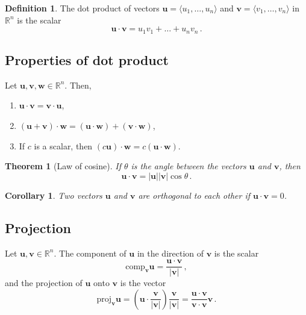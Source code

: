 \documentclass[
]{book}
\newtheorem{theorem}{Theorem}[chapter]
\newtheorem{corollary}{Corollary}[chapter]
\theoremstyle{definition}
\newtheorem{definition}{Definition}[chapter]
\theoremstyle{definition}
\theoremstyle{definition}
\theoremstyle{definition}
\theoremstyle{remark}
\begin{document}
\begin{definition}
The dot product of vectors \(\textbf{u} = \langle u_1, \dots, u_n \rangle\)
and \(\textbf{v} = \langle v_1, \dots, v_n \rangle\) in \(\mathbb{R}^n\) is the
scalar
\begin{equation*}
    \textbf{u} \cdot \textbf{v} = u_1 v_1 +\dots + u_n v_n \,.
\end{equation*}
\end{definition}

\subsection*{Properties of dot product}\label{properties-of-dot-product}


Let \(\textbf{u}, \textbf{v}, \textbf{w} \in \mathbb{R}^n\). Then,

\begin{enumerate}
\def\labelenumi{\arabic{enumi}.}
\item
  \(\textbf{u}\cdot \textbf{v} = \textbf{v}\cdot \textbf{u}\),
\item
  \((\textbf{u} + \textbf{v})\cdot \textbf{w} = (\textbf{u}\cdot \textbf{w}) + (\textbf{v}\cdot \textbf{w})\),
\item
  If \(c\) is a scalar, then \((c \textbf{u})\cdot \textbf{w} = c (\textbf{u}\cdot \textbf{w})\).
\end{enumerate}

\begin{theorem}[Law of cosine]
If \(\theta\) is the angle between the vectors \(\textbf{u}\) and \(\textbf{v}\), then
\begin{equation*}
        \textbf{u}\cdot \textbf{v} = |\textbf{u}|| \textbf{v}| \cos \theta \,.
   \end{equation*}
\end{theorem}

\begin{corollary}
Two vectors \(\textbf{u}\) and \(\textbf{v}\) are orthogonal to each other
if \(\textbf{u} \cdot \textbf{v} = 0\).
\end{corollary}

\subsection*{Projection}\label{projection}


Let \(\textbf{u}, \textbf{v}\in \mathbb{R}^n\). The component of \(\textbf{u}\)
in the direction of \(\textbf{v}\) is the scalar
\begin{equation*}
\mathrm{comp}_{\mathbf{v}}\mathbf{u} = \frac{\mathbf{u}\cdot \mathbf{v}}{|\mathbf{v}|} \,,
\end{equation*}
and the projection of \(\mathbf{u}\) onto \(\mathbf{v}\) is the vector
\begin{equation*}
    \mathrm{proj}_{\mathbf{v}}\mathbf{u} 
    =\left( \mathbf{u}\cdot \frac{\mathbf{v}}{|\mathbf{v}|}\right) \frac{\mathbf{v}}{|\mathbf{v}|} 
    = \frac{\mathbf{u}\cdot \mathbf{v}}{\mathbf{v} \cdot\mathbf{v}} \mathbf{v} \,.
\end{equation*}
\end{document}
